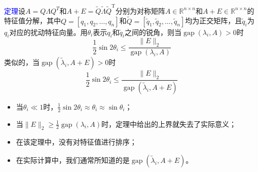 \documentclass[notheorems,serif]{beamer}
\begin{document}
\begin{frame}
\textcolor{blue}{定理}\quad 设$A=Q\Lambda Q^T$和$A+E=\tilde{Q} \tilde{\Lambda} \tilde{Q}^{\mathrm{T}}$分别为对称矩阵$A \in \mathbb{R}^{n \times n}$和$A+E \in \mathbb{R}^{n \times n}$的特征值分解，其中$Q=\left[q_{1}, q_{2}, \ldots, q_{n}\right]$和$\tilde{Q}=\left[\tilde{q}_{1}, \tilde{q}_{2}, \ldots, \tilde{q}_{n}\right]$均为正交矩阵，且$\tilde{q}_{i}$为$q_{i}$对应的扰动特征向量。用$\theta_i$表示$q_{i}$和$\tilde{q}_{i}$之间的锐角，则当$\operatorname{gap}\left(\lambda_{i}, A\right)>0$时$$
\frac{1}{2} \sin 2 \theta_{i} \leq \frac{\|E\|_{2}}{\operatorname{gap}\left(\lambda_{i}, A\right)}
$$类似的，当$\operatorname{gap}\left(\tilde{\lambda}_{i}, A+E\right)>0$时$$
\frac{1}{2} \sin 2 \theta_{i} \leq \frac{\|E\|_{2}}{\operatorname{gap}\left(\tilde{\lambda}_{i}, A+E\right)}
$$
\end{frame}
\begin{frame}

\begin{itemize}
	\item 当$\theta_{i} \ll 1$时，$\frac{1}{2} \sin 2 \theta_{i} \approx \theta_{i} \approx \sin \theta_{i}$；
	\item 当$\|E\|_{2} \geq \frac{1}{2} \operatorname{gap}\left(\lambda_{i}, A\right)$时，定理中给出的上界就失去了实际意义；
	\item 在该定理中，没有对特征值进行排序；
	\item 在实际计算中，我们通常所知道的是$\operatorname{gap}\left(\tilde{\lambda}_{i}, A+E\right)$。
\end{itemize}
\end{frame}
\end{document}
